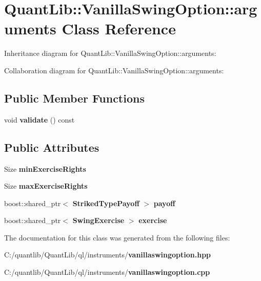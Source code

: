 \section{Quant\+Lib\+:\+:Vanilla\+Swing\+Option\+:\+:arguments Class Reference}
\label{class_quant_lib_1_1_vanilla_swing_option_1_1arguments}


Inheritance diagram for Quant\+Lib\+:\+:Vanilla\+Swing\+Option\+:\+:arguments\+:


Collaboration diagram for Quant\+Lib\+:\+:Vanilla\+Swing\+Option\+:\+:arguments\+:
\subsection*{Public Member Functions}
\begin{DoxyCompactItemize}
\item 
void {\bfseries validate} () const \label{class_quant_lib_1_1_vanilla_swing_option_1_1arguments_a45af31c3004dc3a0fe6fc66332b6e0ab}

\end{DoxyCompactItemize}
\subsection*{Public Attributes}
\begin{DoxyCompactItemize}
\item 
Size {\bfseries min\+Exercise\+Rights}\label{class_quant_lib_1_1_vanilla_swing_option_1_1arguments_aff8d8720e4d021aa6731817e92af790f}

\item 
Size {\bfseries max\+Exercise\+Rights}\label{class_quant_lib_1_1_vanilla_swing_option_1_1arguments_aaa812aaecccb731e0de25dcbb542637b}

\item 
boost\+::shared\+\_\+ptr$<$ {\bf Striked\+Type\+Payoff} $>$ {\bfseries payoff}\label{class_quant_lib_1_1_vanilla_swing_option_1_1arguments_a963a8da436960ae44b1448e203f8130c}

\item 
boost\+::shared\+\_\+ptr$<$ {\bf Swing\+Exercise} $>$ {\bfseries exercise}\label{class_quant_lib_1_1_vanilla_swing_option_1_1arguments_a71c5a50fbba38a05ef80a7f36553802a}

\end{DoxyCompactItemize}


The documentation for this class was generated from the following files\+:\begin{DoxyCompactItemize}
\item 
C\+:/quantlib/\+Quant\+Lib/ql/instruments/{\bf vanillaswingoption.\+hpp}\item 
C\+:/quantlib/\+Quant\+Lib/ql/instruments/{\bf vanillaswingoption.\+cpp}\end{DoxyCompactItemize}
